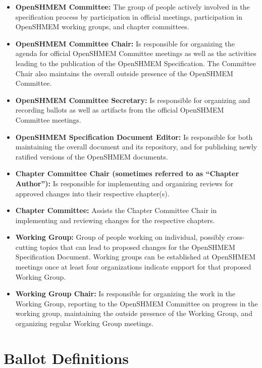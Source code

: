 \begin{itemize}
\item {\bf OpenSHMEM Committee:} The group of people actively involved in the
  specification process by participation in official meetings,
  participation in OpenSHMEM working groups, and chapter committees.
\item {\bf OpenSHMEM Committee Chair:} Is responsible for organizing the agenda
  for official OpenSHMEM Committee meetings as well as the activities leading to the
  publication of the OpenSHMEM Specification. The Committee
  Chair also maintains the overall outside presence of the OpenSHMEM Committee.
\item {\bf OpenSHMEM Committee Secretary:} Is responsible for organizing and
  recording ballots as well as artifacts from the official OpenSHMEM Committee
  meetings.
\item {\bf OpenSHMEM Specification Document Editor:} Is responsible for both
  maintaining the overall document and its repository, and for
  publishing newly ratified versions of the OpenSHMEM documents.
\item {\bf Chapter Committee Chair (sometimes referred to as ``Chapter
  Author''):} Is responsible for implementing and organizing reviews
  for approved changes into their respective chapter(s).
\item {\bf Chapter Committee:} Assists the Chapter Committee Chair in
  implementing and reviewing changes for the respective chapters.
\item {\bf Working Group:} Group of people working on individual,
  possibly cross-cutting topics that can lead to proposed changes for
  the OpenSHMEM Specification Document. Working groups can be established at OpenSHMEM
  meetings once at least four organizations indicate
  support for that proposed Working Group.
\item {\bf Working Group Chair:} Is responsible for organizing the
  work in the Working Group, reporting to the OpenSHMEM Committee on progress in
  the working group, maintaining the outside presence of the Working
  Group, and organizing regular Working Group meetings.
\end{itemize}

\section{Ballot Definitions}

